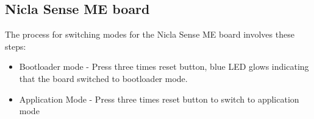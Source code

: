 \documentclass{article}
\begin{document}
\subsection{Nicla Sense ME board}
The process for switching modes for the Nicla Sense ME board involves these steps:
\begin{itemize}
	\item Bootloader mode - Press three times reset button, blue LED glows indicating that the board switched to bootloader mode.
	\item Application Mode - Press three times reset button to switch to application mode
\end{itemize}
\end{document}
